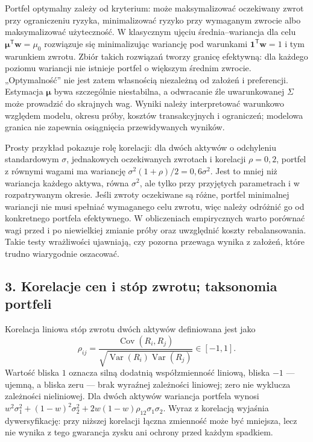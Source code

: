 \documentclass[11pt,a4paper]{article}
\begin{document}
Portfel optymalny zależy od kryterium: może maksymalizować oczekiwany zwrot przy ograniczeniu ryzyka, minimalizować ryzyko przy wymaganym zwrocie albo maksymalizować użyteczność. W klasycznym ujęciu średnia–wariancja dla celu \(\boldsymbol\mu^{\mathsf T}\mathbf w=\mu_0\) rozwiązuje się minimalizując wariancję pod warunkami \(\mathbf 1^{\mathsf T}\mathbf w=1\) i tym warunkiem zwrotu. Zbiór takich rozwiązań tworzy granicę efektywną: dla każdego poziomu wariancji nie istnieje portfel o większym średnim zwrocie. „Optymalność” nie jest zatem własnością niezależną od założeń i preferencji. Estymacja \(\boldsymbol\mu\) bywa szczególnie niestabilna, a odwracanie źle uwarunkowanej \(\Sigma\) może prowadzić do skrajnych wag. Wyniki należy interpretować warunkowo względem modelu, okresu próby, kosztów transakcyjnych i ograniczeń; modelowa granica nie zapewnia osiągnięcia przewidywanych wyników.

Prosty przykład pokazuje rolę korelacji: dla dwóch aktywów o odchyleniu standardowym \(\sigma\), jednakowych oczekiwanych zwrotach i korelacji \(\rho=0{,}2\), portfel z równymi wagami ma wariancję \(\sigma^2(1+\rho)/2=0{,}6\sigma^2\). Jest to mniej niż wariancja każdego aktywa, równa \(\sigma^2\), ale tylko przy przyjętych parametrach i w rozpatrywanym okresie. Jeśli zwroty oczekiwane są różne, portfel minimalnej wariancji nie musi spełniać wymaganego celu zwrotu, więc należy odróżnić go od konkretnego portfela efektywnego. W obliczeniach empirycznych warto porównać wagi przed i po niewielkiej zmianie próby oraz uwzględnić koszty rebalansowania. Takie testy wrażliwości ujawniają, czy pozorna przewaga wynika z założeń, które trudno wiarygodnie oszacować.

\subsection{3. Korelacje cen i stóp zwrotu; taksonomia portfeli}

Korelacja liniowa stóp zwrotu dwóch aktywów definiowana jest jako
\[
\rho_{ij}=\frac{\operatorname{Cov}(R_i,R_j)}
{\sqrt{\operatorname{Var}(R_i)\operatorname{Var}(R_j)}}\in[-1,1].
\]
Wartość bliska \(1\) oznacza silną dodatnią współzmienność liniową, bliska \(-1\) — ujemną, a bliska zeru — brak wyraźnej zależności liniowej; zero nie wyklucza zależności nieliniowej. Dla dwóch aktywów wariancja portfela wynosi \(w^2\sigma_1^2+(1-w)^2\sigma_2^2+2w(1-w)\rho_{12}\sigma_1\sigma_2\). Wyraz z korelacją wyjaśnia dywersyfikację: przy niższej korelacji łączna zmienność może być mniejsza, lecz nie wynika z tego gwarancja zysku ani ochrony przed każdym spadkiem.
\end{document}
